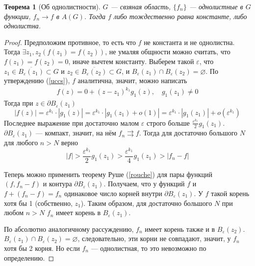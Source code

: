 \documentclass[12pt]{article}
\newcommand{\inter}{\cap}
\newcounter{cnt}
\theoremstyle{thmnote}
\newtheorem{theorem}[cnt]{Теорема}
\theoremstyle{remark}
\theoremstyle{defnote}
\begin{document}
\begin{theorem}[Об однолистности]
\label{one_leaf}
    $G$ --- свзяная область, $\{f_n\}$ --- однолистные в $G$ функции, $f_n \to f$ в $A(G)$. Тогда $f$ либо тождественно равна константе, либо однолистна.
\end{theorem}
\begin{proof}
    Предположим противное, то есть что $f$ не константа и не однолистна. Тогда $\exists z_1, z_2 (f(z_1) = f(z_2))$, не умаляя общности можно считать, что $f(z_1) = f(z_2) = 0$, иначе вычтем константу. Выберем такой $\varepsilon$, что $z_1 \in \overline{B_\varepsilon(z_1)} \subset G$ и $z_2 \in \overline{B_\varepsilon(z_2)} \subset G$, и $B_\varepsilon(z_1) \inter B_\varepsilon(z_2) = \varnothing$. По утверждению (\ref{uccs}), $f$ аналитична, значит, можно написать
    \begin{gather*}
        f(z) = 0 + (z - z_1)^{k_1} g_1(z), \quad g_1(z_1) \neq 0
    \end{gather*}
    Тогда при $z \in \partial B_\varepsilon(z_1)$
    \begin{equation*}
        |f(z)| = \varepsilon^{k_1} \cdot |g_1(z)| = \varepsilon^{k_1} \cdot |g_1(z_1) + o(1)| = \varepsilon^{k_1} \cdot |g_1(z_1)| + o(\varepsilon^{k_1})
    \end{equation*}
    Последнее выражение при достаточно малом $\varepsilon$ строго больше $\frac{\varepsilon^{k_1}}{2} g_1(z_1)$. $\partial B_\varepsilon(z_1)$ --- компакт, значит, на нём $f_n \rightrightarrows f$. Тогда для достаточно большого $N$ для любого $n > N$ верно
    \begin{equation*}
        |f| > \frac{\varepsilon^{k_1}}{2} g_1(z_1) > \frac{\varepsilon^{k_1}}{4} g_1(z_1) > |f_n - f|
    \end{equation*}

    Теперь можно применить теорему Руше (\ref{rouche}) для пары функций $(f, f_n - f)$ и контура $\partial B_\varepsilon(z_1)$. Получаем, что у функций $f$ и $f + (f_n - f) = f_n$ одинаковое число корней внутри $\partial B_\varepsilon(z_1)$. У $f$ такой корень хотя бы 1 (собственно, $z_1$). Таким образом, для достаточно большого $N$ при любом $n > N$ $f_n$ имеет корень в $B_\varepsilon(z_1)$.

    По абсолютно аналогичному рассуждению, $f_n$ имеет корень также и в $B_\varepsilon(z_2)$. $B_\varepsilon(z_1) \inter B_\varepsilon(z_2) = \varnothing$, следовательно, эти корни не совпадают, значит, у $f_n$ хотя бы 2 корня. Но если $f_n$ --- однолистная, то это невозможно по определению.
\end{proof}
\end{document}
